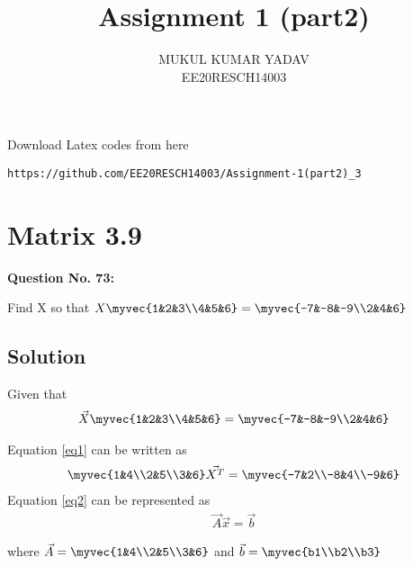 \documentclass[journal,12pt,twocolumn]{IEEEtran}
\begin{document}
     \def\rightbox#1{\makebox[0in][r]{#1}}
     \def\centbox#1{\makebox[0in]{#1}}
     \def\topbox#1{\raisebox{-\baselineskip}[0in][0in]{#1}}
     \def\midbox#1{\raisebox{-0.5\baselineskip}[0in][0in]{#1}}
\vspace{3cm}
\title{Assignment 1 (part2)}
\author{MUKUL KUMAR YADAV\\ EE20RESCH14003}
\maketitle
\newpage
\bigskip
\renewcommand{\thefigure}{\theenumi}
\renewcommand{\thetable}{\theenumi}
 Download Latex codes from here
\begin{lstlisting}
https://github.com/EE20RESCH14003/Assignment-1(part2)_3
\end{lstlisting}
%

%

%
\section{\textbf{ Matrix 3.9}}
\textbf{Question No. 73:} 

Find X so that $X\myvec{1&2&3\\4&5&6}=\myvec{-7&-8&-9\\2&4&6}$

\subsection{\textbf{Solution}}

Given that 
\begin{align}\label{eq1}
\Vec{X}\myvec{1&2&3\\4&5&6}=\myvec{-7&-8&-9\\2&4&6}
\end{align}

Equation \eqref{eq1} can be written as 
\begin{align}\label{eq2}
\myvec{1&4\\2&5\\3&6}\Vec{X^T}=\myvec{-7&2\\-8&4\\-9&6}
\end{align}
Equation \eqref{eq2} can be represented as 
\begin{align}\label{eq3}
\vec{A}\vec{x}=\vec{b}
\end{align}

where $\vec{A}=\myvec{1&4\\2&5\\3&6}$ and $\vec{b}=\myvec{b1\\b2\\b3}$
\end{document}
